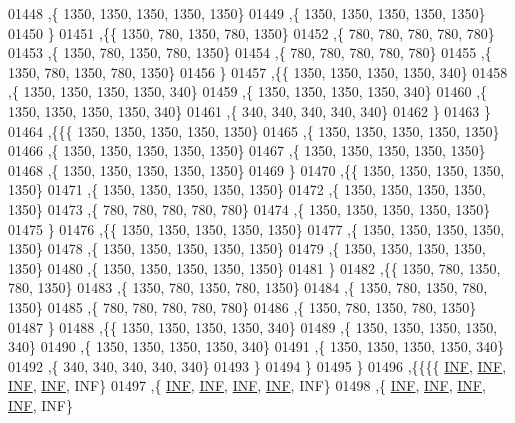 \begin{DoxyCode}
01448    ,\{  1350,  1350,  1350,  1350,  1350\}
01449    ,\{  1350,  1350,  1350,  1350,  1350\}
01450    \}
01451   ,\{\{  1350,   780,  1350,   780,  1350\}
01452    ,\{   780,   780,   780,   780,   780\}
01453    ,\{  1350,   780,  1350,   780,  1350\}
01454    ,\{   780,   780,   780,   780,   780\}
01455    ,\{  1350,   780,  1350,   780,  1350\}
01456    \}
01457   ,\{\{  1350,  1350,  1350,  1350,   340\}
01458    ,\{  1350,  1350,  1350,  1350,   340\}
01459    ,\{  1350,  1350,  1350,  1350,   340\}
01460    ,\{  1350,  1350,  1350,  1350,   340\}
01461    ,\{   340,   340,   340,   340,   340\}
01462    \}
01463   \}
01464  ,\{\{\{  1350,  1350,  1350,  1350,  1350\}
01465    ,\{  1350,  1350,  1350,  1350,  1350\}
01466    ,\{  1350,  1350,  1350,  1350,  1350\}
01467    ,\{  1350,  1350,  1350,  1350,  1350\}
01468    ,\{  1350,  1350,  1350,  1350,  1350\}
01469    \}
01470   ,\{\{  1350,  1350,  1350,  1350,  1350\}
01471    ,\{  1350,  1350,  1350,  1350,  1350\}
01472    ,\{  1350,  1350,  1350,  1350,  1350\}
01473    ,\{   780,   780,   780,   780,   780\}
01474    ,\{  1350,  1350,  1350,  1350,  1350\}
01475    \}
01476   ,\{\{  1350,  1350,  1350,  1350,  1350\}
01477    ,\{  1350,  1350,  1350,  1350,  1350\}
01478    ,\{  1350,  1350,  1350,  1350,  1350\}
01479    ,\{  1350,  1350,  1350,  1350,  1350\}
01480    ,\{  1350,  1350,  1350,  1350,  1350\}
01481    \}
01482   ,\{\{  1350,   780,  1350,   780,  1350\}
01483    ,\{  1350,   780,  1350,   780,  1350\}
01484    ,\{  1350,   780,  1350,   780,  1350\}
01485    ,\{   780,   780,   780,   780,   780\}
01486    ,\{  1350,   780,  1350,   780,  1350\}
01487    \}
01488   ,\{\{  1350,  1350,  1350,  1350,   340\}
01489    ,\{  1350,  1350,  1350,  1350,   340\}
01490    ,\{  1350,  1350,  1350,  1350,   340\}
01491    ,\{  1350,  1350,  1350,  1350,   340\}
01492    ,\{   340,   340,   340,   340,   340\}
01493    \}
01494   \}
01495  \}
01496 ,\{\{\{\{   \hyperlink{energy__const_8h_a12c2040f25d8e3a7b9e1c2024c618cb6}{INF},   \hyperlink{energy__const_8h_a12c2040f25d8e3a7b9e1c2024c618cb6}{INF},   \hyperlink{energy__const_8h_a12c2040f25d8e3a7b9e1c2024c618cb6}{INF},   \hyperlink{energy__const_8h_a12c2040f25d8e3a7b9e1c2024c618cb6}{INF},   INF\}
01497    ,\{   \hyperlink{energy__const_8h_a12c2040f25d8e3a7b9e1c2024c618cb6}{INF},   \hyperlink{energy__const_8h_a12c2040f25d8e3a7b9e1c2024c618cb6}{INF},   \hyperlink{energy__const_8h_a12c2040f25d8e3a7b9e1c2024c618cb6}{INF},   \hyperlink{energy__const_8h_a12c2040f25d8e3a7b9e1c2024c618cb6}{INF},   INF\}
01498    ,\{   \hyperlink{energy__const_8h_a12c2040f25d8e3a7b9e1c2024c618cb6}{INF},   \hyperlink{energy__const_8h_a12c2040f25d8e3a7b9e1c2024c618cb6}{INF},   \hyperlink{energy__const_8h_a12c2040f25d8e3a7b9e1c2024c618cb6}{INF},   \hyperlink{energy__const_8h_a12c2040f25d8e3a7b9e1c2024c618cb6}{INF},   INF\}

\end{DoxyCode}
